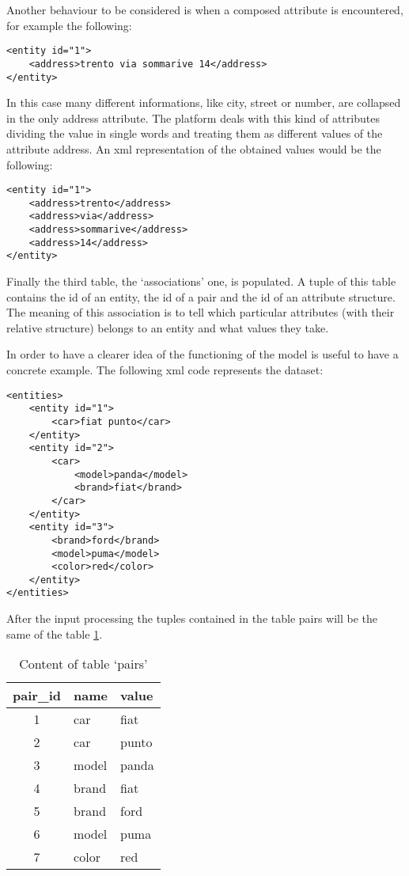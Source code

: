 \documentclass{acm_proc_article-sp-sigmod07}
\begin{document}
Another behaviour to be considered is when a composed attribute is
encountered, for example the following:

\begin{verbatim}
<entity id="1">
    <address>trento via sommarive 14</address>
</entity>
\end{verbatim}

In this case many different informations, like city, street or number, are
collapsed in the only address attribute. The platform deals with this kind
of attributes dividing the value in single words and treating them as
different values of the attribute address. An xml representation of the
obtained values would be the following:

\begin{verbatim}
<entity id="1">
    <address>trento</address>
    <address>via</address>
    <address>sommarive</address>
    <address>14</address>
</entity>
\end{verbatim}

Finally the third table, the `associations' one, is populated. A tuple of
this table contains the id of an entity, the id of a pair and the id of an
attribute structure. The meaning of this association is to tell which
particular attributes (with their relative structure) belongs to an entity
and what values they take.

In order to have a clearer idea of the functioning of the model is useful
to have a concrete example.
The following xml code represents the dataset:

\begin{verbatim}
<entities>
    <entity id="1">
        <car>fiat punto</car>
    </entity>
    <entity id="2">
        <car>
            <model>panda</model>
            <brand>fiat</brand>
        </car>
    </entity>
    <entity id="3">
        <brand>ford</brand>
        <model>puma</model>
        <color>red</color>
    </entity>
</entities>
\end{verbatim}

After the input processing the tuples contained in the table pairs will be
the same of the table \ref{tabp1}.

\begin{table}
\begin{tabular}{|c|l|l|}
\hline
pair\_id & name & value \\
\hline
1 & car & fiat \\ 
2 & car & punto \\
3 & model & panda \\ 
4 & brand & fiat \\
5 & brand & ford \\
6 & model & puma \\
7 & color & red \\
\hline
\end{tabular}
\caption{Content of table `pairs'}
\label{tabp1}
\end{table}
\end{document}
